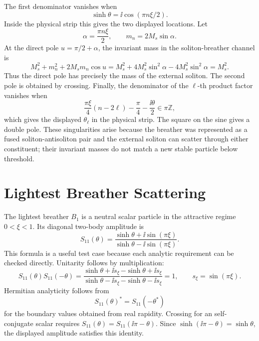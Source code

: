 The first denominator vanishes when
\[
  \sinh\theta=\ii\cos(\pi n\xi/2).
\]
Inside the physical strip this gives the two displayed locations.  Let
\[
  \alpha=\frac{\pi n\xi}{2},
  \qquad
  m_n=2M_s\sin\alpha .
\]
At the direct pole \(u=\pi/2+\alpha\), the invariant mass in the
soliton-breather channel is
\[
  M_s^2+m_n^2+2M_s m_n\cos u
  =
  M_s^2+4M_s^2\sin^2\alpha
  -4M_s^2\sin^2\alpha
  =
  M_s^2 .
\]
Thus the direct pole has precisely the mass of the external soliton.  The
second pole is obtained by crossing.  Finally, the denominator of the
\(\ell\)-th product factor vanishes when
\[
  \frac{\pi\xi}{4}(n-2\ell)-\frac{\pi}{4}
  -\frac{\ii\theta}{2}\in\pi\mathbb Z,
\]
which gives the displayed \(\theta_\ell\) in the physical strip.  The square
on the sine gives a double pole.  These singularities arise because the
breather was represented as a fused soliton-antisoliton pair and the external
soliton can scatter through either constituent; their invariant masses do not
match a new stable particle below threshold.

\section{Lightest Breather Scattering}

The lightest breather \(B_1\) is a neutral scalar particle in the attractive
regime \(0<\xi<1\).  Its diagonal two-body amplitude is
\begin{equation}
  S_{11}(\theta)
  =
  \frac{\sinh\theta+\ii\sin(\pi\xi)}
       {\sinh\theta-\ii\sin(\pi\xi)} .
  \label{eq:sine-gordon-b1b1-smatrix}
\end{equation}
This formula is a useful test case because each analytic requirement can be
checked directly.  Unitarity follows by multiplication:
\[
  S_{11}(\theta)S_{11}(-\theta)
  =
  \frac{\sinh\theta+\ii s_\xi}{\sinh\theta-\ii s_\xi}
  \frac{-\sinh\theta+\ii s_\xi}{-\sinh\theta-\ii s_\xi}
  =
  1,
  \qquad s_\xi=\sin(\pi\xi).
\]
Hermitian analyticity follows from
\[
  S_{11}(\theta)^\ast=S_{11}(-\theta^\ast)
\]
for the boundary values obtained from real rapidity.  Crossing for an
self-conjugate scalar requires \(S_{11}(\theta)=S_{11}(\ii\pi-\theta)\).  Since
\(\sinh(\ii\pi-\theta)=\sinh\theta\), the displayed amplitude satisfies this
identity.

